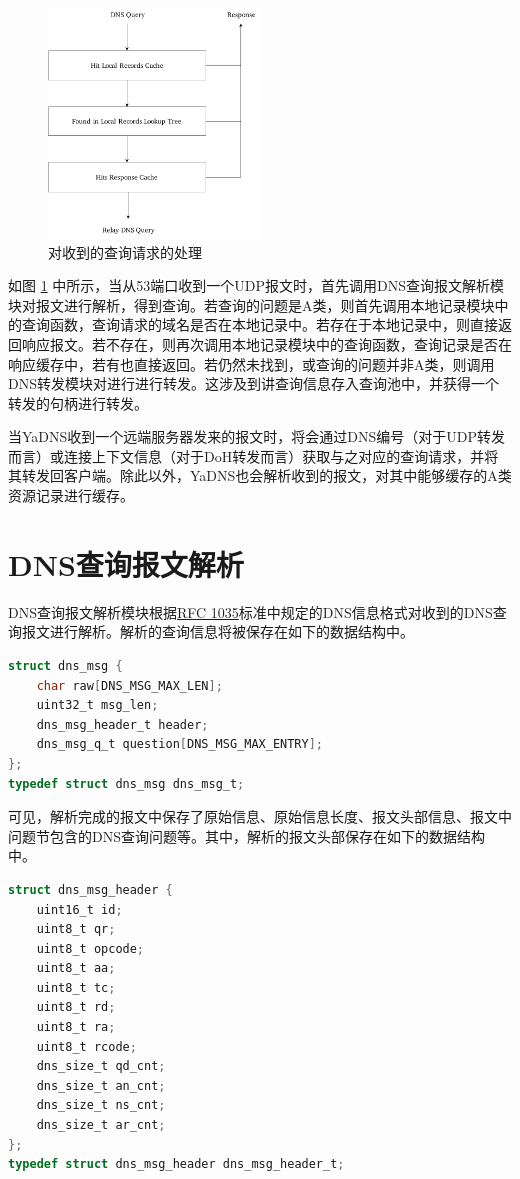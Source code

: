 \begin{figure}[t]
  \centering
  \includegraphics[width=0.5\textwidth]{figures/query}
  \caption{对收到的查询请求的处理}
  \label{fig:query}
\end{figure}

如图 \ref{fig:query} 中所示，当从53端口收到一个UDP报文时，首先调用DNS查询报文解析模块对报文进行解析，得到查询。若查询的问题是A类，则首先调用本地记录模块中的查询函数，查询请求的域名是否在本地记录中。若存在于本地记录中，则直接返回响应报文。若不存在，则再次调用本地记录模块中的查询函数，查询记录是否在响应缓存中，若有也直接返回。若仍然未找到，或查询的问题并非A类，则调用DNS转发模块对进行进行转发。这涉及到讲查询信息存入查询池中，并获得一个转发的句柄进行转发。

当YaDNS收到一个远端服务器发来的报文时，将会通过DNS编号（对于UDP转发而言）或连接上下文信息（对于DoH转发而言）获取与之对应的查询请求，并将其转发回客户端。除此以外，YaDNS也会解析收到的报文，对其中能够缓存的A类资源记录进行缓存。

\section{DNS查询报文解析}

DNS查询报文解析模块根据\href{https://tools.ietf.org/html/rfc1035}{RFC 1035}标准中规定的DNS信息格式对收到的DNS查询报文进行解析。解析的查询信息将被保存在如下的数据结构中。
\begin{lstlisting}[language=C]
struct dns_msg {
    char raw[DNS_MSG_MAX_LEN];
    uint32_t msg_len;
    dns_msg_header_t header;
    dns_msg_q_t question[DNS_MSG_MAX_ENTRY];
};
typedef struct dns_msg dns_msg_t;
\end{lstlisting}

可见，解析完成的报文中保存了原始信息、原始信息长度、报文头部信息、报文中问题节包含的DNS查询问题等。其中，解析的报文头部保存在如下的数据结构中。
\begin{lstlisting}[language=C]
struct dns_msg_header {
    uint16_t id;
    uint8_t qr;
    uint8_t opcode;
    uint8_t aa;
    uint8_t tc;
    uint8_t rd;
    uint8_t ra;
    uint8_t rcode;
    dns_size_t qd_cnt;
    dns_size_t an_cnt;
    dns_size_t ns_cnt;
    dns_size_t ar_cnt;
};
typedef struct dns_msg_header dns_msg_header_t;
\end{lstlisting}

